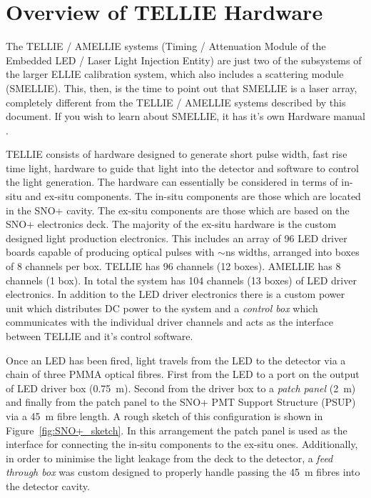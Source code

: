 \documentclass[12pt]{report}
\begin{document}

\section{Overview of TELLIE Hardware}

The TELLIE / AMELLIE systems (Timing / Attenuation Module of the Embedded LED / Laser Light Injection Entity) are just two of the subsystems of the larger ELLIE calibration system, which also includes a scattering module (SMELLIE). This, then, is the time to point out that SMELLIE is a laser array, completely different from the TELLIE / AMELLIE systems described by this document. If you wish to learn about SMELLIE, it has it's own Hardware manual \cite{smellieHardwareMan}.

TELLIE consists of hardware designed to generate short pulse width, fast rise time light, hardware to guide that light into the detector and software to control the light generation. The hardware can essentially be considered in terms of in-situ and ex-situ components. The in-situ components are those which are located in the SNO+ cavity. The ex-situ components are those which are based on the SNO+ electronics deck. The majority of the ex-situ hardware is the custom designed light production electronics. This includes an array of 96 LED driver boards capable of producing optical pulses with $\sim$ns widths, arranged into boxes of 8 channels per box. TELLIE has 96 channels (12 boxes). AMELLIE  has 8 channels (1 box). In total the system has 104 channels (13 boxes) of LED driver electronics. In addition to the LED driver electronics there is a custom power unit which distributes DC power to the system and a \textit{control box} which communicates with the individual driver channels and acts as the interface between TELLIE and it's control software. 

Once an LED has been fired, light travels from the LED to the detector via a chain of three PMMA optical fibres. First from the LED to a port on the output of LED driver box (0.75~m). Second from the driver box to a \textit{patch panel} (2~m) and finally from the patch panel to the SNO+ PMT Support Structure (PSUP) via a 45~m fibre length. A rough sketch of this configuration is shown in Figure~\ref{fig:SNO+_sketch}. In this arrangement the patch panel is used as the interface for connecting the in-situ components to the ex-situ ones. Additionally, in order to minimise the light leakage from the deck to the detector, a \textit{feed through box} was custom designed to properly handle passing the 45~m fibres into the detector cavity.
\end{document}
